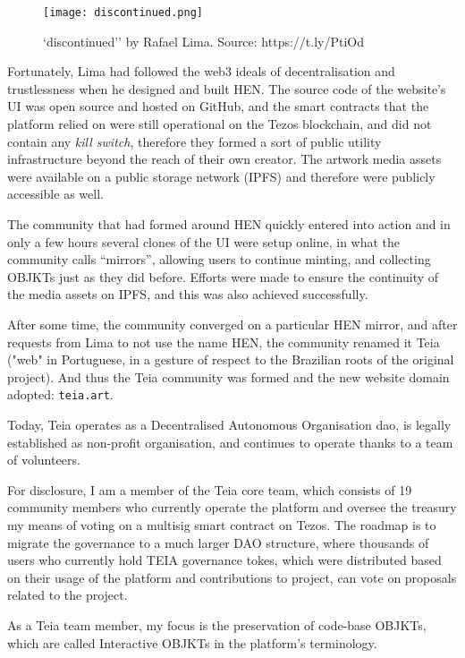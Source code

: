 \begin{figure}[h]
    \centering
    \texttt{[image: discontinued.png]}
    \caption[``discontinued'' by Rafael Lima]{`discontinued'' by Rafael Lima. Source: https://t.ly/PtiOd}
    \label{fig:discontinued}
\end{figure}

Fortunately, Lima had followed the web3 ideals of decentralisation and trustlessness when he designed and built HEN. The source code of the website's UI was open source and hosted on GitHub, and the smart contracts that the platform relied on were still operational on the Tezos blockchain, and did not contain any \emph{kill switch}, therefore they formed a sort of public utility infrastructure beyond the reach of their own creator. The artwork media assets were available on a public storage network (IPFS) and therefore were publicly accessible as well.

The community that had formed around HEN quickly entered into action and in only a few hours several clones of the UI were setup online, in what the community calls ``mirrors'', allowing users to continue minting, and collecting OBJKTs just as they did before. Efforts were made to ensure the continuity of the media assets on IPFS, and this was also achieved successfully.

After some time, the community converged on a particular HEN mirror, and after requests from Lima to not use the name HEN, the community renamed it Teia ("web" in Portuguese, in a gesture of respect to the Brazilian roots of the original project). And thus the Teia community was formed and the new website domain adopted: \texttt{teia.art}.

Today, Teia operates as a Decentralised Autonomous Organisation \gls{dao}, is legally established as non-profit organisation, and continues to operate thanks to a team of volunteers.

For disclosure, I am a member of the Teia core team, which consists of 19 community members who currently operate the platform and oversee the treasury my means of voting on a multisig smart contract on Tezos. The roadmap is to migrate the governance to a much larger DAO structure, where thousands of users who currently hold TEIA governance tokes, which were distributed based on their usage of the platform and contributions to project, can vote on proposals related to the project.

As a Teia team member, my focus is the preservation of code-base OBJKTs, which are called Interactive OBJKTs in the platform's terminology.

